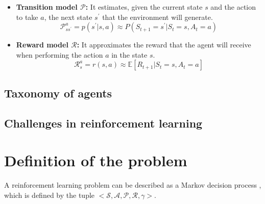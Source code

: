 \begin{itemize}
    \item \textbf{Transition model $\mathcal{P}$:} It estimates, given the current state $s$ and the action to take $a$, the next state $s^\prime$ that the environment will generate.
    \begin{equation}
        \mathcal{P}^a_{ss^\prime} = p(s^\prime|s,a) \approx P(S_{t+1} = s^\prime|S_t = s, A_t = a)
    \end{equation}
    \item \textbf{Reward model $\mathcal{R}$:} It approximates the reward that the agent will receive when performing the action $a$ in the state $s$.
    \begin{equation}
        \mathcal{R}^a_s = r(s,a) \approx \mathbb{E}[R_{t+1}| S_t = s, A_t = a]
    \end{equation}
\end{itemize}

\subsection{Taxonomy of agents}

\subsection{Challenges in reinforcement learning}
\label{sec:challenges}

\section{Definition of the problem}

A reinforcement learning problem can be described as a Markov decision process \cite{Sutton:2014}, which is defined by the tuple $<\mathcal{S}, \mathcal{A},\mathcal{P},\mathcal{R},\gamma>$.

